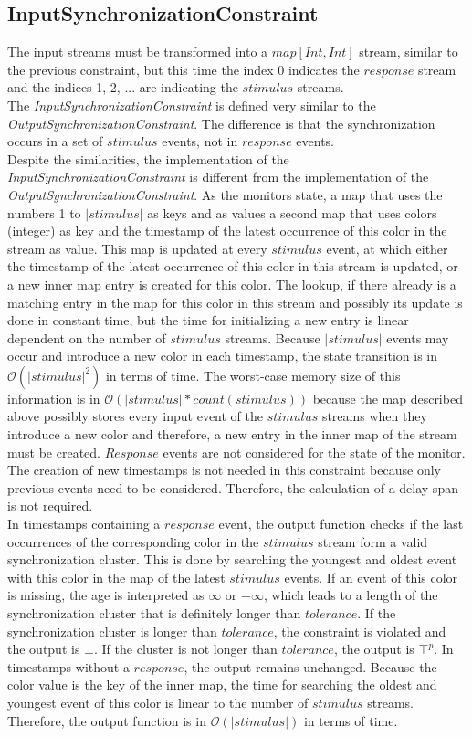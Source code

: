 \subsection{InputSynchronizationConstraint}
	The input streams must be transformed into a $map[Int, Int]$ stream, similar to the previous constraint, but this time the index 0 indicates the $response$ stream and the indices 1, 2, ... are indicating the $stimulus$ streams.\\
	The \emph{InputSynchronizationConstraint} is defined very similar to the \emph{OutputSynchronizationConstraint}. The difference is that the synchronization occurs in a set of $stimulus$ events, not in $response$ events.\\
	Despite the similarities, the implementation of the \emph{InputSynchronizationConstraint}  is different from the implementation of the \emph{OutputSynchronizationConstraint}. As the monitors state, a map that uses the numbers 1 to $|stimulus|$ as keys and as values a second map that uses colors (integer) as key and the timestamp of the latest occurrence of this color in the stream as value. This map is updated at every $stimulus$ event, at which either the timestamp of the latest occurrence of this color in this stream is updated, or a new inner map entry is created for this color.  The lookup, if there already is a matching entry in the map for this color in this stream and possibly its update is done in constant time, but the time for initializing a new entry is linear dependent on the number of $stimulus$ streams. Because $|stimulus|$ events may occur and introduce a new color in each timestamp, the state transition is in $\mathcal{O}(|stimulus|^2)$ in terms of time. The worst-case memory size of this information is in $\mathcal{O}(|stimulus|*count(stimulus))$ because the map described above possibly stores every input event of the $stimulus$ streams when they introduce a new color and therefore, a new entry in the inner map of the stream must be created. $Response$ events are not considered for the state of the monitor.\\
	The creation of new timestamps is not needed in this constraint because only previous events need to be considered. Therefore, the calculation of a delay span is not required.\\
	In timestamps containing a $response$ event, the output function checks if the last occurrences of the corresponding color in the $stimulus$ stream form a valid synchronization cluster. This is done by searching the youngest and oldest event with this color in the map of the latest $stimulus$ events. If an event of this color is missing, the age is interpreted as $\infty$ or $-\infty$, which leads to a length of the synchronization cluster that is definitely longer than $tolerance$. If the synchronization cluster is longer than $tolerance$, the constraint is violated and the output is $\bot$. If the cluster is not longer than $tolerance$, the output is $\top^p$. In timestamps without a $response$, the output remains unchanged. Because the color value is the key of the inner map, the time for searching the oldest and youngest event of this color is linear to the number of $stimulus$ streams. Therefore, the output function is in $\mathcal{O}(|stimulus|)$ in terms of time.
	

